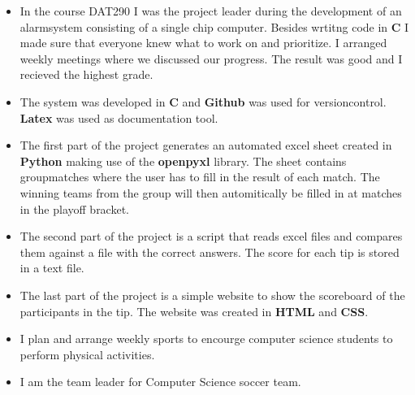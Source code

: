 \documentclass[10pt,a4paper,ragged2e]{altacv}
\begin{document}
\begin{fullwidth}

\begin{itemize}
  \item In the course DAT290 I was the project leader during the development of an alarmsystem 
  consisting of a single chip computer. Besides wrtitng code in \textbf{C} I made sure that everyone 
  knew what to work on and prioritize. I arranged weekly meetings where we discussed our progress. 
  The result was good and I recieved the highest grade.
  \item The system was developed in \textbf{C} and \textbf{Github} was used for versioncontrol.
  \textbf{Latex} was used as documentation tool.
   
\end{itemize}

\divider

\begin{itemize}
  \item The first part of the project generates an automated excel sheet created in \textbf{Python} 
  making use of the \textbf{openpyxl} library. The sheet contains groupmatches where the user has 
  to fill in the result of each match. The winning teams from the group will then automitically be filled in 
  at matches in the playoff bracket.
  \item The second part of the project is a script that reads excel files and compares them
  against a file with the correct answers. The score for each tip is stored in a text file.
  \item The last part of the project is a simple website to show the scoreboard of the participants in the tip.
   The website was created in \textbf{HTML} and \textbf{CSS}.
\end{itemize}


\begin{itemize}
  \item I plan and arrange weekly sports to encourge computer science students
   to perform physical activities. 
  \item I am the team leader for Computer Science soccer team.
\end{itemize}


\end{fullwidth}
\end{document}

